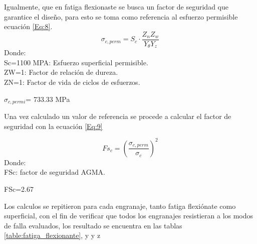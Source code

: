 Igualmente, que en fatiga flexionaste se busca un factor de seguridad que garantice el diseño, para esto se toma como referencia al esfuerzo permisible ecuación \ref{Eq:8}.
\begin{equation}
    \sigma_{c,perm}=S_{c}\cdot \frac{Z_{n}Z_{w}}{Y_{\theta}Y_{z}}
    \label{Eq:8}
\end{equation}
Donde:\\ 
Sc=1100 MPA: Esfuerzo superficial permisible.\\
ZW=1: Factor de relación de dureza.\\
ZN=1: Factor de vida de ciclos de esfuerzos.\\
\begin{center}
    $\sigma_{c, permi}$= 733.33 MPa
\end{center}

Una vez calculado un valor de referencia se procede a calcular el factor de seguridad con la ecuación \ref{Eq:9}

\begin{equation}
    Fs_{c}=(\frac{\sigma_{c,perm}}{\sigma_{c}})^{2}
    \label{Eq:9}
\end{equation}
Donde:\\
FSc: factor de seguridad AGMA.
\begin{center}
    FSc=2.67
\end{center}


Los calculos se repitieron para cada engranaje, tanto fatiga flexiónate como superficial, con el fin de verificar que todos los engranajes resistieran a los modos de falla evaluados, los resultado se encuentra en las tablas \ref{table:fatiga_flexionante}, y y z







\newpage

